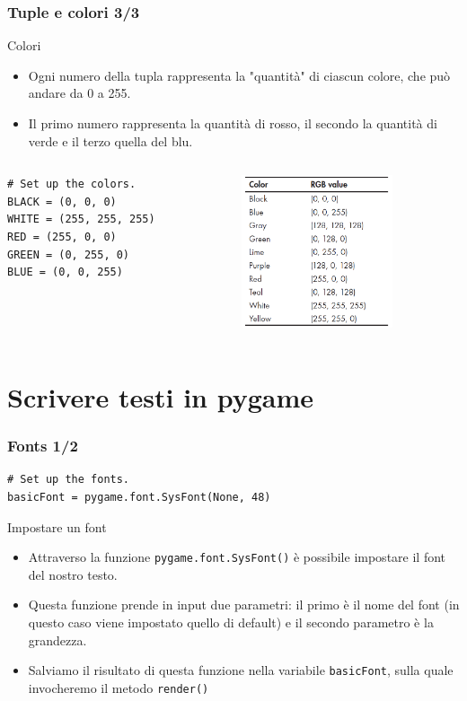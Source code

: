 \documentclass{beamer}
\begin{document}
\begin{frame}[fragile]
\frametitle{Tuple e colori 3/3}
\begin{block}{Colori}
	\begin{itemize}
		\item Ogni numero della tupla rappresenta la "quantità" di ciascun colore, che può andare da 0 a 255.
		\item Il primo numero rappresenta la quantità di rosso, il secondo la quantità di verde e il terzo quella del blu.
	\end{itemize}
\end{block}
\begin{columns}[T]
	\begin{column}[T]{0.5\textwidth}
		\begin{lstlisting}
# Set up the colors.
BLACK = (0, 0, 0)
WHITE = (255, 255, 255)
RED = (255, 0, 0)
GREEN = (0, 255, 0)
BLUE = (0, 0, 255)
		\end{lstlisting}
	\end{column}
	\begin{column}[T]{0.5\textwidth}
		\begin{figure}[t]
			\includegraphics[height=4.5cm, width=6cm]{images/TabellaColori.png}
		\end{figure}
	\end{column}
\end{columns}
\end{frame}

\section{Scrivere testi in pygame}

\begin{frame}[fragile]
\frametitle{Fonts 1/2}
\begin{lstlisting}
# Set up the fonts.
basicFont = pygame.font.SysFont(None, 48)
\end{lstlisting}
\begin{block}{Impostare un font}
	\begin{itemize}
		\item Attraverso la funzione \texttt{pygame.font.SysFont()} è possibile impostare il font del nostro testo.
		\item Questa funzione prende in input due parametri: il primo è il nome del font (in questo caso viene impostato quello di default) e il secondo parametro è la grandezza.
		\item Salviamo il risultato di questa funzione nella variabile \texttt{basicFont}, sulla quale invocheremo il metodo \texttt{render()}
	\end{itemize}
\end{block}
\end{frame}
\end{document}

